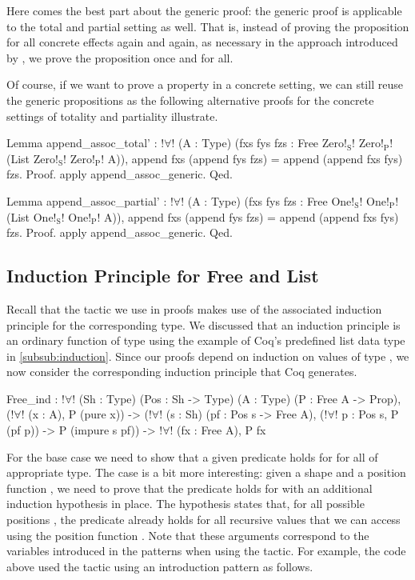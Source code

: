 Here comes the best part about the generic proof: the generic proof is applicable to the total and partial setting as well.
That is, instead of proving the proposition for all concrete effects again and again, as necessary in the approach introduced by \citet{abel2005verifying}, we prove the proposition once and for all.

Of course, if we want to prove a property in a concrete setting, we can still reuse the generic propositions as the following alternative proofs for the concrete settings of totality and partiality illustrate.

\begin{coqcode}
Lemma append_assoc_total' :
 !$\forall$! (A : Type) (fxs fys fzs : Free Zero!$_\text{S}$! Zero!$_\text{P}$! (List Zero!$_\text{S}$! Zero!$_\text{P}$! A)),
   append fxs (append fys fzs) = append (append fxs fys) fzs.
Proof.
 apply append_assoc_generic.
Qed.

Lemma append_assoc_partial' :
 !$\forall$! (A : Type) (fxs fys fzs : Free One!$_\text{S}$! One!$_\text{P}$! (List One!$_\text{S}$! One!$_\text{P}$! A)),
   append fxs (append fys fzs) = append (append fxs fys) fzs.
Proof.
 apply append_assoc_generic.
Qed.
\end{coqcode}

\subsection{Induction Principle for Free and List}

Recall that the  tactic we use in proofs makes use of the associated induction principle for the corresponding type.
We discussed that an induction principle is an ordinary function of type  using the example of Coq's predefined list data type in \autoref{subsub:induction}.
Since our proofs depend on induction on values of type , we now consider the corresponding induction principle that Coq generates.

\begin{coqcode}
Free_ind : !$\forall$! (Sh : Type) (Pos : Sh -> Type) (A : Type) (P : Free A -> Prop),
   (!$\forall$! (x : A), P (pure x)) ->
   (!$\forall$! (s : Sh) (pf : Pos s -> Free A),
     (!$\forall$! p : Pos s, P (pf p)) -> P (impure s pf)) ->
   !$\forall$! (fx : Free A), P fx
\end{coqcode}

For the base case we need to show that a given predicate  holds for  for all  of appropriate type.
The  case is a bit more interesting: given a shape  and a position function , we need to prove that the predicate holds for  with an additional induction hypothesis in place.
The hypothesis states that, for all possible positions , the predicate already holds for all recursive values that we can access using the position function .
Note that these arguments correspond to the variables introduced in the patterns when using the  tactic.
For example, the code above used the tactic using an introduction pattern as follows.

